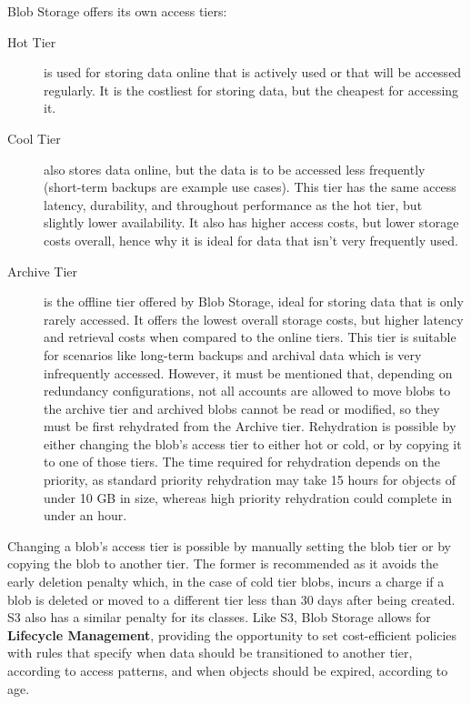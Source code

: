 \bigskip
Blob Storage offers its own access tiers: ~\cite{blobinfo}
\begin{description}
    \item[Hot Tier] is used for storing data online that is actively used or that will be accessed regularly. It is the costliest for storing data, but the cheapest for accessing it.

    \item[Cool Tier] also stores data online, but the data is to be accessed less frequently (short-term backups are example use cases). This tier has the same access latency, durability, and throughout performance as the hot tier, but slightly lower availability. It also has higher access costs, but lower storage costs overall, hence why it is ideal for data that isn't very frequently used.

    \item[Archive Tier] is the offline tier offered by Blob Storage, ideal for storing data that is only rarely accessed. It offers the lowest overall storage costs, but higher latency and retrieval costs when compared to the online tiers. This tier is suitable for scenarios like long-term backups and archival data which is very infrequently accessed. However, it must be mentioned that, depending on redundancy configurations, not all accounts are allowed to move blobs to the archive tier and archived blobs cannot be read or modified, so they must be first rehydrated from the Archive tier. Rehydration is possible by either changing the blob's access tier to either hot or cold, or by copying it to one of those tiers. The time required for rehydration depends on the priority, as standard priority rehydration may take 15 hours for objects of under 10 GB in size, whereas high priority rehydration could complete in under an hour.
\end{description}

Changing a blob's access tier is possible by manually setting the blob tier or by copying the blob to another tier. The former is recommended as it avoids the early deletion penalty which, in the case of cold tier blobs, incurs a charge if a blob is deleted or moved to a different tier less than 30 days after being created. S3 also has a similar penalty for its classes. Like S3, Blob Storage allows for \textbf{Lifecycle Management}, providing the opportunity to set cost-efficient policies with rules that specify when data should be transitioned to another tier, according to access patterns, and when objects should be expired, according to age.

